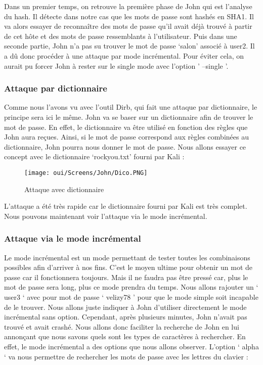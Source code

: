 Dans un premier temps, on retrouve la première phase de John qui est l’analyse du hash. Il détecte dans notre cas que les mots de passe sont hashés en SHA1.
Il va alors essayer de reconnaître des mots de passe qu’il avait déjà trouvé à partir de cet hôte et des mots de passe ressemblants à l’utilisateur.
Puis dans une seconde partie, John n’a pas su trouver le mot de passe ‘salon’ associé à user2. Il a dû donc procéder à une attaque par mode incrémental. Pour éviter cela, on aurait pu forcer John à rester sur le single mode avec l'option ' --single '.


\subsubsection{Attaque par dictionnaire}

Comme nous l’avons vu avec l’outil Dirb, qui fait une attaque par dictionnaire, le principe sera ici le même. John va se baser sur un dictionnaire afin de trouver le mot de passe. En effet, le dictionnaire va être utilisé en fonction des règles que John aura reçues. Ainsi, si le mot de passe correspond aux règles combinées au dictionnaire, John pourra nous donner le mot de passe.
Nous allons essayer ce concept avec le dictionnaire ‘rockyou.txt’ fourni par Kali :

\begin{figure}[htp!]
  \centering
  \setlength\figureheight{7cm}
  \setlength\figurewidth{9cm}
  \texttt{[image: oui/Screens/John/Dico.PNG]}
  \caption{Attaque avec dictionnaire}
  \label{fig:courbe-tikz}
\end{figure}

L’attaque a été très rapide car le dictionnaire fourni par Kali est très complet.
    Nous pouvons maintenant voir l’attaque via le mode incrémental.

\subsubsection{Attaque via le mode incrémental}
Le mode incrémental est un mode permettant de tester toutes les combinaisons possibles afin d'arriver à nos fins. C’est le moyen ultime pour obtenir un mot de passe car il fonctionnera toujours. Mais il ne faudra pas être pressé car, plus le mot de passe sera long, plus ce mode prendra du temps.
Nous allons rajouter un ‘ user3 ‘ avec pour mot de passe ‘ velizy78 ’ pour que le mode simple soit incapable de le trouver. Nous allons juste indiquer à John d’utiliser directement le mode incrémental sans option.
Cependant, après plusieurs minutes, John n’avait pas trouvé et avait crashé.
Nous allons donc faciliter la recherche de John en lui annonçant que nous savons quels sont les types de caractères à rechercher. En effet, le mode incrémental a des options que nous allons observer.
L’option ‘ alpha ‘ va nous permettre de rechercher les mots de passe avec les lettres du clavier :

